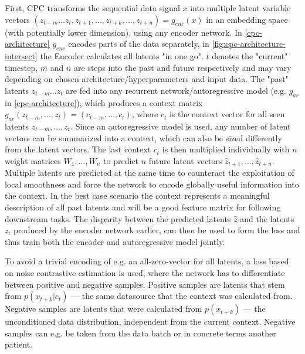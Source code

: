 First, CPC transforms the sequential data signal $x$ into multiple latent variable vectors $(z_{t-m}\ldots z_t, z_{t+1},\ldots, z_{t+k}, \ldots, z_{t+n})=g_{enc}(x)$ in an embedding space (with potentially lower dimension), using any encoder network. In \autoref{cpc-architecture} $g_{enc}$ encodes parts of the data separately, in \autoref{fig:cpc-architecture-intersect} the Encoder calculates all latents "in one go". $t$ denotes the "current" timestep, $m$ and $n$ are steps into the past and future respectively and may vary depending on chosen architecture/hyperparameters and input data.  The "past" latents $z_{t-m}\ldots z_{t}$ are fed into any recurrent network/autoregressive model (e.g. $g_{ar}$ in \autoref{cpc-architecture}), which produces a context matrix $g_{ar}(z_{t-m}, \ldots, z_{t})=(c_{t-m}, \ldots, c_{t})$, where $c_t$ is the context vector for all seen latents $z_{t-m},\ldots, z_{t}$. Since an autoregressive model is used, any number of latent vectors can be summarized into a context, which can also be sized differently from the latent vectors. The last context $c_t$ is then multiplied individually with $n$ weight matrices $W_1,\ldots, W_n$ to predict $n$ future latent vectors $\hat{z}_{t+1},\ldots, \hat{z}_{t+n}$. Multiple latents are predicted at the same time to counteract the exploitation of local smoothness and force the network to encode globally useful information into the context. In the best case scenario the context represents a meaningful description of all past latents and will be a good feature matrix for following downstream tasks. The disparity between the predicted latents $\hat{z}$ and the latents $z$, produced by the encoder network earlier, can then be used to form the loss and thus train both the encoder and autoregressive model jointly. 

To avoid a trivial encoding of e.g. an all-zero-vector for all latents, a loss based on noise contrastive estimation \autocite{pmlr-v9-gutmann10a} is used, where the network has to differentiate between positive and negative samples. Positive samples are latents that stem from $p(x_{t+k}|c_t)$ --- the same datasource that the context was calculated from. Negative samples are latents that were calculated from $p(x_{t+k})$ --- the unconditioned data distribution, independent from the current context. Negative samples can e.g. be taken from the data batch or in concrete terms another patient.



